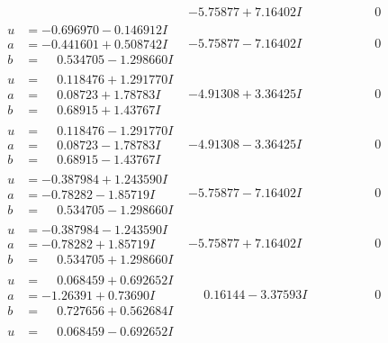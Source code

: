 \documentclass[1p]{elsarticle_modified}
\theoremstyle{definition}
\begin{document}
$$\begin{array}{c|c|c}
 & -5.75877 + 7.16402 I & \phantom{-0.000000 } 0 \\ \hline\begin{aligned}
u &= -0.696970 - 0.146912 I \\
a &= -0.441601 + 0.508742 I \\
b &= \phantom{-}0.534705 - 1.298660 I\end{aligned}
 & -5.75877 - 7.16402 I & \phantom{-0.000000 } 0 \\ \hline\begin{aligned}
u &= \phantom{-}0.118476 + 1.291770 I \\
a &= \phantom{-}0.08723 + 1.78783 I \\
b &= \phantom{-}0.68915 + 1.43767 I\end{aligned}
 & -4.91308 + 3.36425 I & \phantom{-0.000000 } 0 \\ \hline\begin{aligned}
u &= \phantom{-}0.118476 - 1.291770 I \\
a &= \phantom{-}0.08723 - 1.78783 I \\
b &= \phantom{-}0.68915 - 1.43767 I\end{aligned}
 & -4.91308 - 3.36425 I & \phantom{-0.000000 } 0 \\ \hline\begin{aligned}
u &= -0.387984 + 1.243590 I \\
a &= -0.78282 - 1.85719 I \\
b &= \phantom{-}0.534705 - 1.298660 I\end{aligned}
 & -5.75877 - 7.16402 I & \phantom{-0.000000 } 0 \\ \hline\begin{aligned}
u &= -0.387984 - 1.243590 I \\
a &= -0.78282 + 1.85719 I \\
b &= \phantom{-}0.534705 + 1.298660 I\end{aligned}
 & -5.75877 + 7.16402 I & \phantom{-0.000000 } 0 \\ \hline\begin{aligned}
u &= \phantom{-}0.068459 + 0.692652 I \\
a &= -1.26391 + 0.73690 I \\
b &= \phantom{-}0.727656 + 0.562684 I\end{aligned}
 & \phantom{-}0.16144 - 3.37593 I & \phantom{-0.000000 } 0 \\ \hline\begin{aligned}
u &= \phantom{-}0.068459 - 0.692652 I \\

\end{aligned}
\end{array}$$
\end{document}
